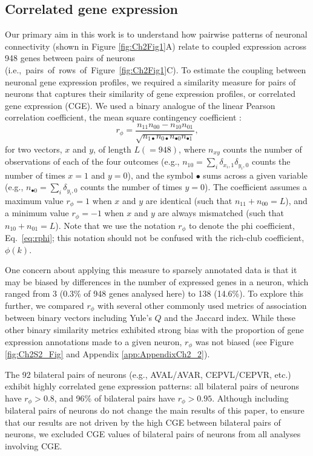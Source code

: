 \subsection*{Correlated gene expression}
Our primary aim in this work is to understand how pairwise patterns of neuronal connectivity (shown in Figure \ref{fig:Ch2Fig1}A) relate to coupled expression across 948 genes between pairs of neurons \mbox{(i.e., pairs of rows of Figure \ref{fig:Ch2Fig1}C)}.
To estimate the coupling between neuronal gene expression profiles, we required a similarity measure for pairs of neurons that captures their similarity of gene expression profiles, or correlated gene expression (CGE).
We used a binary analogue of the linear Pearson correlation coefficient, the mean square contingency coefficient \citep{Warrens2008}:
\begin{equation} \label{eq:rphi}
    r_\phi = \frac{n_{11}n_{00} - n_{10}n_{01}}{\sqrt{n_{1\bullet}n_{0\bullet}n_{\bullet 0}n_{\bullet 1}}},
\end{equation}
for two vectors, $x$ and $y$, of length $L (=948)$, where $n_{xy}$ counts the number of observations of each of the four outcomes (e.g., $n_{10} = \sum_i \delta_{x_i,1}\delta_{y_i,0}$ counts the number of times $x=1$ and $y=0$), and the symbol $\bullet$ sums across a given variable (e.g., $n_{\bullet 0} = \sum_i \delta_{y_i,0}$ counts the number of times $y = 0$).
The coefficient assumes a maximum value $r_\phi = 1$ when $x$ and $y$ are identical (such that $n_{11} + n_{00} = L$), and a minimum value $r_\phi = -1$ when $x$ and $y$ are always mismatched (such that $n_{10} + n_{01} = L$).
Note that we use the notation $r_\phi$ to denote the phi coefficient, Eq.~\eqref{eq:rphi}; this notation should not be confused with the rich-club coefficient, $\phi(k)$.

One concern about applying this measure to sparsely annotated data is that it may be biased by differences in the number of expressed genes in a neuron, which ranged from 3 (0.3\% of 948 genes analysed here) to 138 (14.6\%).
To explore this further, we compared $r_\phi$ with several other commonly used metrics of association between binary vectors including Yule's $Q$ and the Jaccard index.
While these other binary similarity metrics exhibited strong bias with the proportion of gene expression annotations made to a given neuron, $r_\phi$ was not biased (see Figure \ref{fig:Ch2S2_Fig} and Appendix \ref{app:AppendixCh2_2}).

The 92 bilateral pairs of neurons (e.g., AVAL/AVAR, CEPVL/CEPVR, etc.) exhibit highly correlated gene expression patterns: all bilateral pairs of neurons have $r_\phi > 0.8$, and 96\% of bilateral pairs have $r_\phi > 0.95$.
Although including bilateral pairs of neurons do not change the main results of this paper, to ensure that our results are not driven by the high CGE between bilateral pairs of neurons, we excluded CGE values of bilateral pairs of neurons from all analyses involving CGE.

